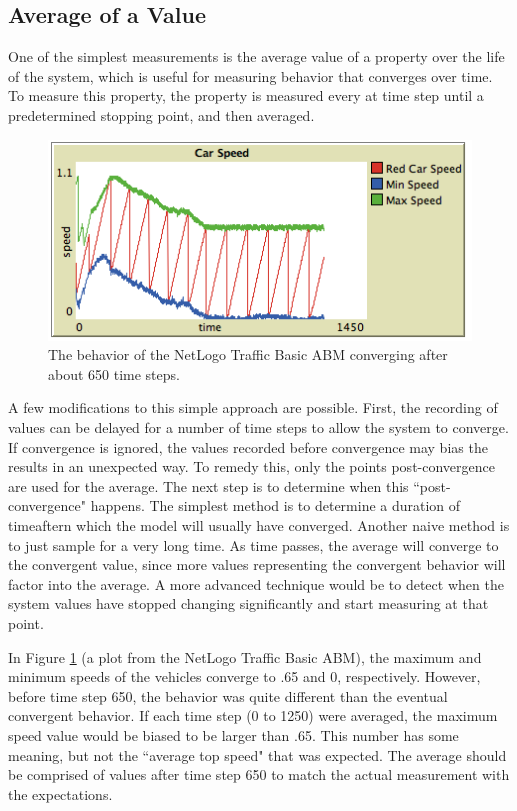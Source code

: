 \subsection{Average of a Value}
One of the simplest measurements is the average value of a property over the life of the system, which is useful for measuring behavior that converges over time.
To measure this property, the property is measured every at time step until a predetermined stopping point, and then averaged.

\begin{figure}[ht]
\centering
\includegraphics[scale=.75]{images/traffic_converge.png}
\caption{The behavior of the NetLogo Traffic Basic ABM converging after about 650 time steps.}
\label{fig:traffic_converge}
\end{figure}


A few modifications to this simple approach are possible.
First, the recording of values can be delayed for a number of time steps to allow the system to converge.
If convergence is ignored, the values recorded before convergence may bias the results in an unexpected way.
To remedy this, only the points post-convergence are used for the average.
The next step is to determine when this ``post-convergence" happens.
The simplest method is to determine a duration of timeaftern which the model will usually have converged.
Another naive method is to just sample for a very long time.
As time passes, the average will converge to the convergent value, since more values representing the convergent behavior will factor into the average.
A more advanced technique would be to detect when the system values have stopped changing significantly and start measuring at that point.

In Figure \ref{fig:traffic_converge} (a plot from the NetLogo Traffic Basic ABM), the maximum and minimum speeds of the vehicles converge to .65 and 0, respectively.
However, before time step 650, the behavior was quite different than the eventual convergent behavior.
If each time step (0 to 1250) were averaged, the maximum speed value would be biased to be larger than .65.
This number has some meaning, but not the ``average top speed" that was expected.
The average should be comprised of values after time step 650 to match the actual measurement with the expectations.


